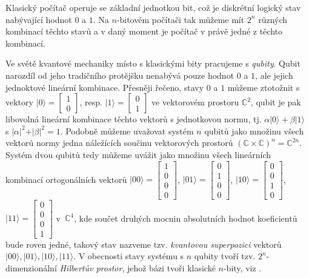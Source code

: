 \documentclass[12pt]{report}
\begin{document}
Klasický počítač operuje se základní jednotkou bit, což je diskrétní logický stav nabývající hodnot $0$ a $1$. Na $n$-bitovém počítači tak můžeme mít $2^n$ různých kombinací těchto stavů a v daný moment je počítač v právě jedné z těchto kombinací.

Ve světě kvantové mechaniky místo s klasickými bity pracujeme s \textit{qubity}. Qubit narozdíl od jeho tradičního protějšku nenabývá pouze hodnot $0$ a $1$, ale jejich jednoktové lineární kombinace. Přesněji řečeno, stavy $0$ a $1$ můžeme ztotožnit s vektory $\vert 0 \rangle = \begin{bmatrix}
1\\
0
\end{bmatrix}$, resp. $\vert 1 \rangle = \begin{bmatrix}
0\\
1
\end{bmatrix}$ ve vektorovém prostoru $\mathbb{C}^2$, qubit je pak libovolná lineární kombinace těchto vektorů s jednotkovou normu, tj. $\alpha \vert 0 \rangle + \beta \vert 1 \rangle$ s $\vert \alpha \vert ^2 + \vert \beta \vert ^2 =1$. Podobně můžeme uvažovat systém $n$ qubitů jako množinu všech vektorů normy jedna náležících součinu vektorových prostorů $(\mathbb{C} \times \mathbb{C})^n = \mathbb{C}^{2n}$. Systém dvou qubitů tedy můžeme uvážit jako množinu všech lineárních kombinací ortogonálních vektorů $\vert 00 \rangle = \begin{bmatrix}
1\\
0\\
0\\
0
\end{bmatrix}$, $\vert 01 \rangle = \begin{bmatrix}
0\\
1\\
0\\
0
\end{bmatrix}$, $\vert 10 \rangle = \begin{bmatrix}
0\\
0\\
1\\
0
\end{bmatrix}$, $\vert 11 \rangle = \begin{bmatrix}
0\\
0\\
0\\
1
\end{bmatrix}$ v~$\mathbb{C}^4$, kde součet druhých mocnin absolutních hodnot koeficientů bude roven jedné, takový stav nazveme tzv. \textit{kvantovou superpozici} vektorů $\vert 00 \rangle, \vert 01 \rangle, \vert 10 \rangle, \vert 11 \rangle$. V obecnosti stavy systému s $n$ qubity tvoří tzv. $2^n$-dimenzionální \textit{Hilbertův prostor}, jehož bázi tvoři klasické $n$-bity, viz \cite{Griffiths}.
\end{document}
